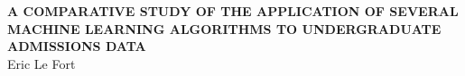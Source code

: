 \begin{titlepage}
\begin{changemargin}{0cm}{-1.4cm}
\begin{center}
	\vspace*{6cm}
	\textbf{\Large A COMPARATIVE STUDY OF THE APPLICATION OF SEVERAL MACHINE LEARNING ALGORITHMS TO UNDERGRADUATE ADMISSIONS DATA}
	\vspace{3cm}~\\
	\large Eric Le Fort
\end{center}
\end{changemargin}
\end{titlepage}